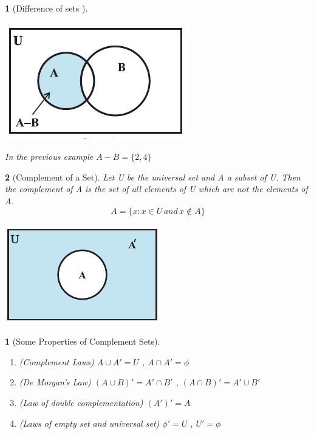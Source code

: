 \documentclass[12pt]{article}
\theoremstyle{colored}
\newtheorem*{defn}{}
\theoremstyle{subcolored}
\newtheorem*{subdefn}{}
\begin{document}
\begin{multicols}{2}
\begin{defn}[\large Difference of sets ]
\begin{center}
    \includegraphics[scale=0.4]{set6.png}
\end{center}

In the previous example $A-B=\{2,4\}$
\end{defn}

\begin{defn}[\large Complement of a Set]
    \hfill \break 
    Let U be the universal set and A a subset of U. Then the complement of
A is the set of all elements of U which are not the elements of A.
$$A=\{x: x \in U\, and\, x \not \in A\}$$

\begin{center}
    \includegraphics[scale=0.4]{set7.png}
\end{center}

\end{defn}

\begin{subdefn}[Some Properties of Complement Sets]
    \hfill \break
    \begin{enumerate}
        \item (Complement Laws) $A \cup A'=U$ ,  $A \cap A'= \phi$
        \item (De Morgan's Law) $(A \cup B)'= A' \cap B'$ , $(A \cap B)'= A' \cup B'$
        \item (Law of double complementation) $(A')'=A$
        \item  (Laws of empty set and universal set) $\phi ' = U$ , $U'=\phi$
    \end{enumerate} 
    
\end{subdefn}
\end{multicols}
 
\end{document}
